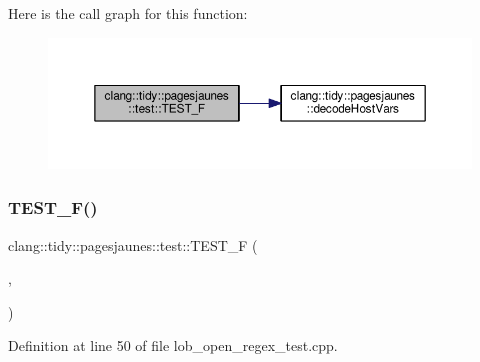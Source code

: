 Here is the call graph for this function\+:
\nopagebreak
\begin{figure}[H]
\begin{center}
\leavevmode
\includegraphics[width=350pt]{namespaceclang_1_1tidy_1_1pagesjaunes_1_1test_aeb03cd64c4a45d216a71b1b17a9aed3e_cgraph}
\end{center}
\end{figure}
\mbox{\label{namespaceclang_1_1tidy_1_1pagesjaunes_1_1test_aecfb17d2b0da07b94bbe5fcc9eaeccc1}} 
\subsubsection{\texorpdfstring{T\+E\+S\+T\+\_\+\+F()}{TEST\_F()}\hspace{0.1cm}{\footnotesize\ttfamily [14/57]}}
{\footnotesize\ttfamily clang\+::tidy\+::pagesjaunes\+::test\+::\+T\+E\+S\+T\+\_\+F (\begin{DoxyParamCaption}\item[{\hyperlink{classclang_1_1tidy_1_1pagesjaunes_1_1test_1_1_lob_open_regex_test}{Lob\+Open\+Regex\+Test}}]{,  }\item[{Regex\+Matching\+Indicators}]{ }\end{DoxyParamCaption})}



Definition at line 50 of file lob\+\_\+open\+\_\+regex\+\_\+test.\+cpp.


